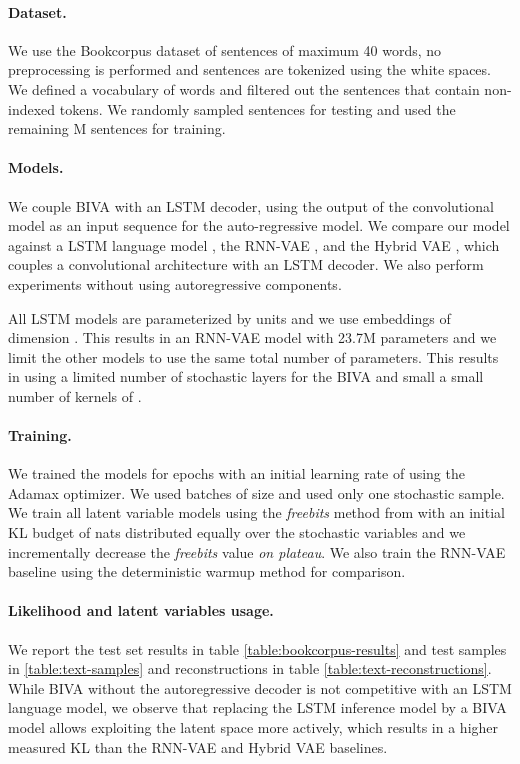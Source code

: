 \documentclass{article}
\def\nm{BIVA\xspace}
\begin{document}
\paragraph{Dataset.} We use the Bookcorpus dataset \cite{bookcorpus} of sentences of maximum 40 words, no preprocessing is performed and sentences are tokenized using the white spaces. We defined a vocabulary of  words and filtered out the sentences that contain non-indexed tokens. We randomly sampled  sentences for testing and used the remaining M sentences for training.  

\paragraph{Models.} We couple \nm with an LSTM decoder, using the output of the convolutional model as an input sequence for the auto-regressive model. We compare our model against a LSTM language model \cite{hochreiter1997long}, the RNN-VAE \cite{Bowman2015}, and the Hybrid VAE \cite{semeniuta2017hybrid}, which couples a convolutional architecture with an LSTM decoder. We also perform experiments without using autoregressive components.

All LSTM models are parameterized by  units and we use embeddings of dimension . This results in an RNN-VAE model with 23.7M parameters and we limit the other models to use the same total number of parameters. This results in using a limited number of stochastic layers for the \nm and small a small number of kernels of .

\paragraph{Training.} We trained the models for  epochs with an initial learning rate of  using the Adamax optimizer. We used batches of size  and used only one stochastic sample. We train all latent variable models using the \textit{freebits} method from \cite{Kingma2016} with an initial KL budget of  nats distributed equally over the stochastic variables and we incrementally decrease the \textit{freebits} value \textit{on plateau}. We also train the RNN-VAE baseline using the deterministic warmup method \citep{Bowman2015,Sonderby2016} for comparison.

\paragraph{Likelihood and latent variables usage.}
We report the test set results in table \ref{table:bookcorpus-results} and test samples in \ref{table:text-samples} and reconstructions in table \ref{table:text-reconstructions}. While \nm without the autoregressive decoder is not competitive with an LSTM language model, we observe that replacing the LSTM inference model by a \nm model allows exploiting the latent space more actively, which results in a higher measured KL than the RNN-VAE and Hybrid VAE baselines.
\end{document}
